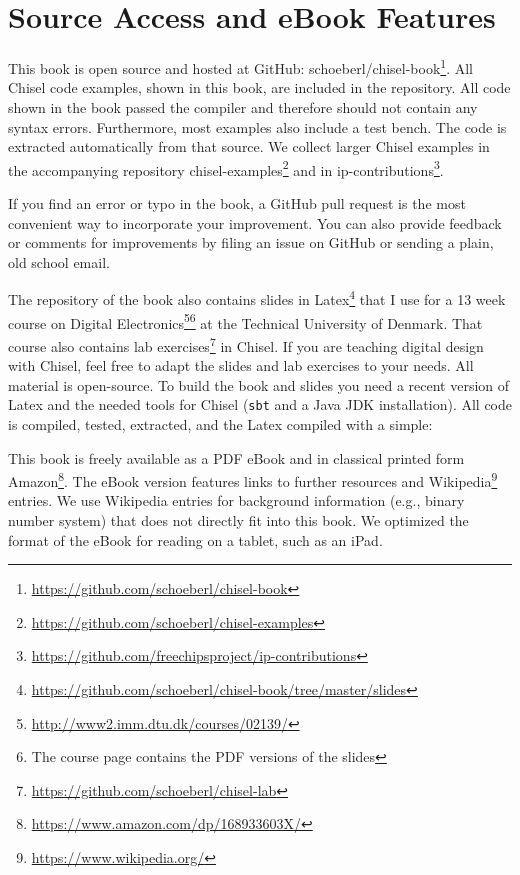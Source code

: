 \documentclass[%
    10pt,
    headinclude, footexclude,
    openright, %
    notitlepage,
    cleardoubleempty,
    headsepline,
    pointlessnumbers,
    bibtotoc, idxtotoc,
    ]{scrbook}
\newcommand{\code}[1]{{\small{\texttt{#1}}}}
\newcommand{\myref}[2]{\href{#1}{#2}}
\renewcommand{\myref}[2]{{#2}{\footnote{\url{#1}}}}
\begin{document}
\section{Source Access and eBook Features}

This book is open source and hosted at GitHub: \myref{https://github.com/schoeberl/chisel-book}{schoeberl/chisel-book}.
All Chisel code examples, shown in this book, are included in the repository.
All code shown in the book passed the compiler and therefore should not contain any syntax errors.
Furthermore, most examples also include a test bench.
The code is extracted automatically from that source.
We collect larger Chisel examples in the accompanying repository
\myref{https://github.com/schoeberl/chisel-examples}{chisel-examples}
and in \myref{https://github.com/freechipsproject/ip-contributions}{ip-contributions}.

If you find an error or typo in the book, a GitHub pull request is the most convenient way to incorporate your improvement.
You can also provide feedback or comments for improvements by filing an issue on GitHub
or sending a plain, old school email.

The repository of the book also contains
\myref{https://github.com/schoeberl/chisel-book/tree/master/slides}{slides in Latex}
that I use for a 13 week course on
\myref{http://www2.imm.dtu.dk/courses/02139/}{Digital Electronics}\footnote{The course page
contains the PDF versions of the slides} at the Technical University of Denmark.
That course also contains \myref{https://github.com/schoeberl/chisel-lab}{lab exercises}
in Chisel.
If you are teaching digital design with Chisel, feel free to adapt the slides and lab
exercises to your needs. All material is open-source. To build the book and slides
you need a recent version of Latex and the needed tools for Chisel (\code{sbt} and
a Java JDK installation). All code is compiled, tested, extracted, and the Latex compiled with
a simple:


This book is freely available as a PDF eBook and in classical printed form
\myref{https://www.amazon.com/dp/168933603X/}{Amazon}.
The eBook version features links to further resources
and \myref{https://www.wikipedia.org/}{Wikipedia} entries.
We use Wikipedia entries for background information (e.g., binary number system)
that does not directly fit into this book.
We optimized the format of the eBook for reading on a tablet, such as an iPad.
\end{document}

